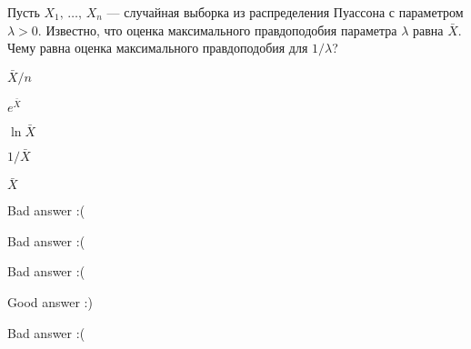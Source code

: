 
\begin{question}
Пусть \(X_1, \, \ldots, \, X_n\) --- случайная выборка из распределения
Пуассона с параметром \(\lambda > 0\). Известно, что оценка
максимального правдоподобия параметра \(\lambda\) равна \(\bar{X}\).
Чему равна оценка максимального правдоподобия для \(1 / \lambda\)?
\begin{answerlist}
  \item \(\bar{X} / n\)
  \item \(e^{\bar{X}}\)
  \item \(\ln \bar{X}\)
  \item \(1 / \bar{X}\)
  \item \(\bar{X}\)
\end{answerlist}
\end{question}

\begin{solution}
\begin{answerlist}
  \item Bad answer :(
  \item Bad answer :(
  \item Bad answer :(
  \item Good answer :)
  \item Bad answer :(
\end{answerlist}
\end{solution}

